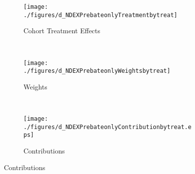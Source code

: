\begin{figure}
    \caption{Change in Nondurable Spending: Rebate Sample}
    \begin{subfigure}[t]{\linewidth}
        \centering\texttt{[image: ./figures/d\_NDEXPrebateonlyTreatmentbytreat]}
        \caption{Cohort Treatment Effects}
        \label{fig:rebateonlyd_NDEXPTreatmentbytreat.eps}
      \end{subfigure}\\
      \begin{subfigure}[t]{\linewidth}
        \centering\texttt{[image: ./figures/d\_NDEXPrebateonlyWeightsbytreat]}
        \caption{Weights}
        \label{fig:rebateonlyd_NDEXPWeightsbytreat.eps}
      \end{subfigure}\\
      \begin{subfigure}[t]{\linewidth}
        \centering\texttt{[image: ./figures/d\_NDEXPrebateonlyContributionbytreat.eps]}
        \caption{Contributions}
        \label{fig:rebateonlyd_NDEXPContributionbytreat}
      \end{subfigure}
      \label{fig:rebateonlyd_NDEXP}
\end{figure}   